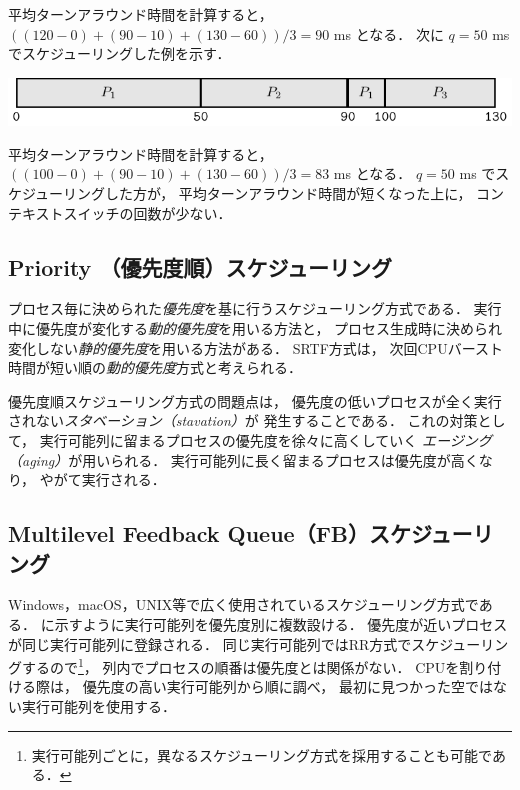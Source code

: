平均ターンアラウンド時間を計算すると，
$((120-0)+(90-10)+(130-60))/3=90$ ms となる．
次に $q = 50$ ms でスケジューリングした例を示す．

\begin{center}
  \includegraphics[scale=1.0]{GanntChart/rr2.pdf}
\end{center}

平均ターンアラウンド時間を計算すると，
$((100-0)+(90-10)+(130-60))/3=83$ ms となる．
$q = 50$ ms でスケジューリングした方が，
平均ターンアラウンド時間が短くなった上に，
コンテキストスイッチの回数が少ない．

\subsection{Priority （優先度順）スケジューリング}
プロセス毎に決められた\emph{優先度}を基に行うスケジューリング方式である．
実行中に優先度が変化する\emph{動的優先度}を用いる方法と，
プロセス生成時に決められ変化しない\emph{静的優先度}を用いる方法がある．
SRTF方式は，
次回CPUバースト時間が短い順の\emph{動的優先度}方式と考えられる．

優先度順スケジューリング方式の問題点は，
優先度の低いプロセスが全く実行されない\emph{スタベーション（stavation）}が
発生することである．
これの対策として，
実行可能列に留まるプロセスの優先度を徐々に高くしていく
\emph{エージング（aging）}が用いられる．
実行可能列に長く留まるプロセスは優先度が高くなり，
やがて実行される．

\subsection{Multilevel Feedback Queue（FB）スケジューリング}
Windows，macOS，UNIX等で広く使用されているスケジューリング方式である．
に示すように実行可能列を優先度別に複数設ける．
優先度が近いプロセスが同じ実行可能列に登録される．
同じ実行可能列ではRR方式でスケジューリングするので\footnote{
  実行可能列ごとに，異なるスケジューリング方式を採用することも可能である．
}，
列内でプロセスの順番は優先度とは関係がない．
CPUを割り付ける際は，
優先度の高い実行可能列から順に調べ，
最初に見つかった空ではない実行可能列を使用する．

